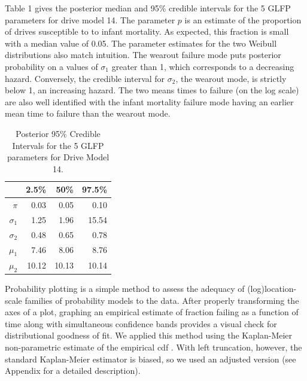\documentclass[12pt]{article}
\begin{document}
Table 1 gives the posterior median and 95\% credible intervals for the 5 GLFP parameters for drive model 14.  The parameter $p$ is an estimate of the proportion of drives susceptible to to infant mortality.  As expected, this fraction is small with a median value of 0.05.  The parameter estimates for the two Weibull distributions also match intuition.  The wearout failure mode puts posterior probability on a values of $\sigma_1$ greater than 1, which corresponds to a decreasing hazard.  Conversely, the credible interval for $\sigma_2$, the wearout mode, is strictly below 1, an increasing hazard.  The two means times to failure (on the log scale) are also well identified with the infant mortality failure mode having an earlier mean time to failure than the wearout mode. 

\begin{table}[H]
\centering
\begin{tabular}{rrrr}
  \hline
 & 2.5\% & 50\% & 97.5\% \\ 
  \hline
$\pi$ & 0.03 & 0.05 & 0.10 \\ 
 $\sigma_1$ & 1.25 & 1.96 & 15.54 \\ 
  $\sigma_2$ & 0.48 & 0.65 & 0.78 \\ 
  $\mu_1$ & 7.46 & 8.06 & 8.76 \\ 
  $\mu_2$ & 10.12 & 10.13 & 10.14 \\ 
   \hline
\end{tabular}
\caption{Posterior 95\% Credible Intervals for the 5 GLFP parameters for Drive Model 14.}
\label{table:1}
\end{table}

Probability plotting is a simple method to assess the adequacy of (log)location-scale families of probability models to the data.  After properly transforming the axes of a plot, graphing an empirical estimate of fraction failing as a function of time along with simultaneous confidence bands provides a visual check for distributional goodness of fit.  We applied this method using the Kaplan-Meier non-parametric estimate of the empirical cdf \cite{kaplan}.  With left truncation, however, the standard Kaplan-Meier estimator is biased, so we used an adjusted version (see Appendix for a detailed description).   
\end{document}

